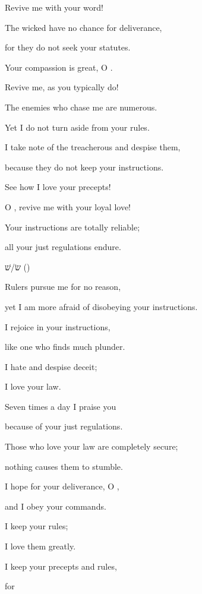 {\par }{\Q Revive
me with your word!
\par }{\Q {}The wicked
have no chance
for deliverance,
\par }{\Q for
they do not
seek
your statutes.
\par }{\Q {}Your compassion
is great,
O
{}.
\par }{\Q Revive
me, as you typically do!
\par }{\Q {}The enemies
who chase
me are numerous.
\par }{\Q Yet I do not
turn aside
from your rules.
\par }{\Q {}I take note
of the treacherous
and despise
them,
\par }{\Q because they do not
keep
your instructions.
\par }{\Q {}See
how I love
your precepts!
\par }{\Q O
{}, revive
me with your loyal love!
\par }{\Q {}Your instructions
are totally reliable;
\par }{\Q all
your just regulations endure.
\par }{\SH שׂ/שׁ ({})
\par }{\Q {}Rulers pursue me for no reason,
\par }{\Q yet I am more afraid of disobeying your instructions.
\par }{\Q {}I
rejoice
in your instructions,
\par }{\Q like one who finds
much
plunder.
\par }{\Q {}I hate
and despise
deceit;
\par }{\Q I love
your law.
\par }{\Q {}Seven
times a day
I praise
you
\par }{\Q because
of your just regulations.
\par }{\Q {}Those who love
your law
are completely
secure;
\par }{\Q nothing
causes them to stumble.
\par }{\Q {}I hope
for your deliverance,
O
{},
\par }{\Q and I obey your commands.
\par }{\Q {}I keep
your
rules;
\par }{\Q I love
them greatly.
\par }{\Q {}I keep
your precepts
and rules,
\par }{\Q for
}
